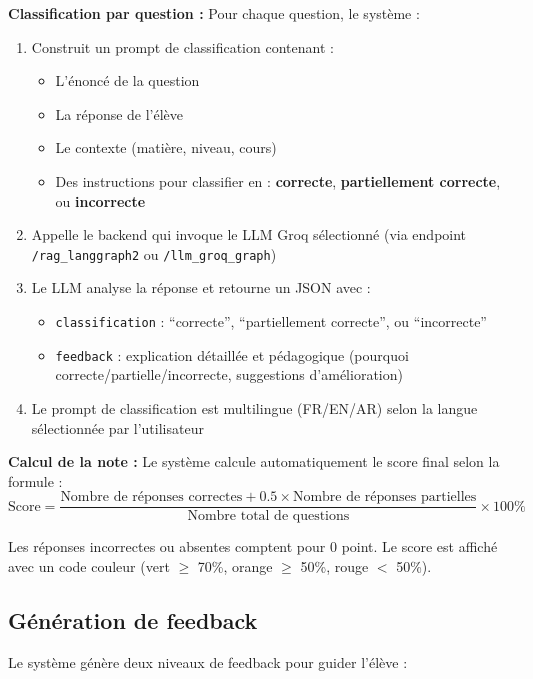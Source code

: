 \textbf{Classification par question :}
Pour chaque question, le système :
\begin{enumerate}
    \item Construit un prompt de classification contenant :
    \begin{itemize}
        \item L'énoncé de la question
        \item La réponse de l'élève
        \item Le contexte (matière, niveau, cours)
        \item Des instructions pour classifier en : \textbf{correcte}, \textbf{partiellement correcte}, ou \textbf{incorrecte}
    \end{itemize}
    \item Appelle le backend qui invoque le LLM Groq sélectionné (via endpoint \texttt{/rag\_langgraph2} ou \texttt{/llm\_groq\_graph})
    \item Le LLM analyse la réponse et retourne un JSON avec :
    \begin{itemize}
        \item \texttt{classification} : ``correcte'', ``partiellement correcte'', ou ``incorrecte''
        \item \texttt{feedback} : explication détaillée et pédagogique (pourquoi correcte/partielle/incorrecte, suggestions d'amélioration)
    \end{itemize}
    \item Le prompt de classification est multilingue (FR/EN/AR) selon la langue sélectionnée par l'utilisateur
\end{enumerate}

\textbf{Calcul de la note :}
Le système calcule automatiquement le score final selon la formule :
\begin{equation}
\text{Score} = \frac{\text{Nombre de réponses correctes} + 0.5 \times \text{Nombre de réponses partielles}}{\text{Nombre total de questions}} \times 100\%
\end{equation}

Les réponses incorrectes ou absentes comptent pour 0 point. Le score est affiché avec un code couleur (vert $\geq$ 70\%, orange $\geq$ 50\%, rouge $<$ 50\%).

\subsection{Génération de feedback}

Le système génère deux niveaux de feedback pour guider l'élève :

